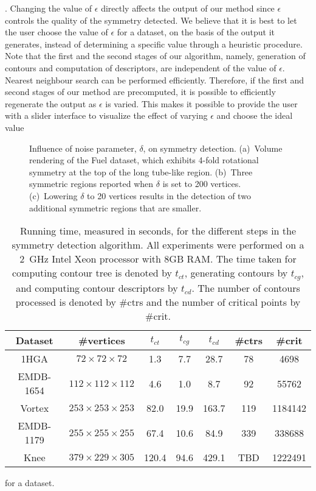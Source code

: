 \documentclass[review,journal]{vgtc}         %
\begin{document}
.
Changing the value of $\epsilon$ directly affects the output of  our method since $\epsilon$
controls the quality of the symmetry detected. We believe that it is best to let the user choose the value
of $\epsilon$ for a dataset, on the basis of the output it generates, instead of determining a specific
value through a heuristic procedure. Note that the first and the second stages of our algorithm,
namely, generation of contours and computation of descriptors, are independent of the value of 
$\epsilon$. Nearest neighbour search can be performed efficiently. Therefore, if the first and 
second stages of our method are precomputed, it is possible to efficiently regenerate the output
as $\epsilon$ is varied. This makes it possible to provide the user with a slider interface
to visualize the effect of varying $\epsilon$ and choose the ideal value 
\begin{figure}[t]
	\centering
	\caption{\label{delta}Influence of noise parameter, $\delta$, on symmetry detection. (a)~Volume rendering of 
		the Fuel dataset, which exhibits 4-fold rotational symmetry at the top of the long tube-like region.
		(b)~Three symmetric regions reported when $\delta$ is set to 200 vertices. (c)~Lowering
	$\delta$ to 20 vertices results in the detection of two additional symmetric regions that are smaller.}
\end{figure}
\begin{table}[b]
\centering
{\color{blue}
{\small
\caption{Running time, measured in seconds, for the different steps in the symmetry detection algorithm.
	All experiments were performed on a 2~GHz Intel Xeon processor with 8GB RAM. The time taken for
	computing contour tree is denoted by $t_{ct}$, generating contours by $t_{cg}$, and computing contour descriptors
	by $t_{cd}$. The number of contours processed is denoted by \#ctrs and the number of critical points by \#crit.}
\label{exp-table}
\begin{tabular}{c||c|c|c|c|c|c}
Dataset		&\#vertices 			&$t_{ct}$	&$t_{cg}$	&$t_{cd}$	&\#ctrs	&\#crit\\
\hline
1HGA	 	&$72\times72\times72$ 		&1.3 		&7.7 		&28.7       	&78	&4698\\
EMDB-1654 	&$112\times112\times112$ 	&4.6 		&1.0		&8.7      	&92	&55762\\ 
Vortex		&$253\times253\times253$	&82.0	 	&19.9		&163.7		&119	&1184142\\
EMDB-1179 	&$255\times255\times255$ 	&67.4		&10.6		&84.9     	&339	&338688\\ 
Knee 		&$379\times229\times305$ 	&120.4		&94.6		&429.1		&TBD	&1222491 
\end{tabular}
}
}
\end{table}
for a dataset.
\end{document}
